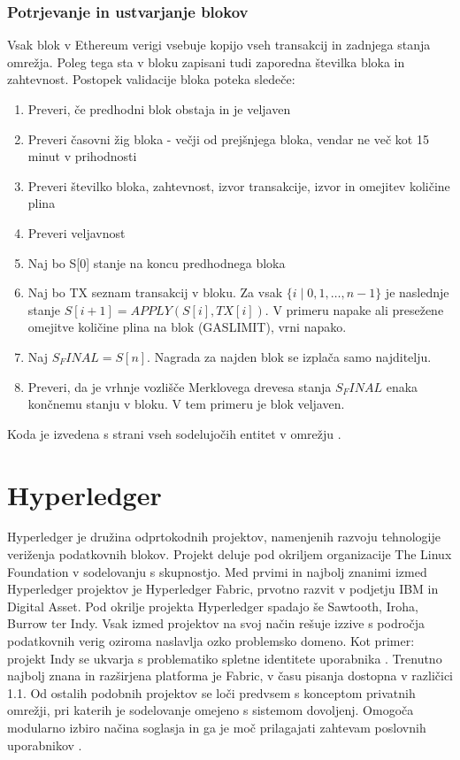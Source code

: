 \documentclass[a4paper, 12pt]{book}
\begin{document}
\subsubsection{Potrjevanje in ustvarjanje blokov}
Vsak blok v Ethereum verigi vsebuje kopijo vseh transakcij in zadnjega stanja omrežja.
Poleg tega sta v bloku zapisani tudi zaporedna številka bloka in zahtevnost.
Postopek validacije bloka poteka sledeče:
\begin{enumerate}
\item Preveri, če predhodni blok obstaja in je veljaven
\item Preveri časovni žig bloka - večji od prejšnjega bloka, vendar ne več kot 15 minut v prihodnosti
\item Preveri številko bloka, zahtevnost, izvor transakcije, izvor  in omejitev količine plina
\item Preveri veljavnost 
\item Naj bo S[0] stanje na koncu predhodnega bloka
\item Naj bo TX seznam transakcij v bloku. Za vsak 
$\{i \mid 0,1,\dots, n-1\}$
je naslednje stanje
 $S[i+1] = APPLY(S[i], TX[i])$.
V primeru napake ali presežene omejitve količine plina na blok (GASLIMIT), vrni napako.
\item Naj $S_FINAL = S[n]$. Nagrada za najden blok se izplača samo najditelju.
\item Preveri, da je vrhnje vozlišče Merklovega drevesa stanja $S_FINAL$ enaka končnemu stanju v bloku. V tem primeru je blok veljaven.
\end{enumerate}

Koda je izvedena s strani vseh sodelujočih entitet v omrežju \cite{ethereumWhitepaper}.

\section{Hyperledger}
Hyperledger je družina odprtokodnih projektov, namenjenih razvoju tehnologije veriženja podatkovnih blokov.
Projekt deluje pod okriljem organizacije The Linux Foundation v sodelovanju s skupnostjo.
Med prvimi in najbolj znanimi izmed Hyperledger projektov je Hyperledger Fabric, prvotno razvit v podjetju IBM in Digital Asset.
Pod okrilje projekta Hyperledger spadajo še Sawtooth, Iroha, Burrow ter Indy.
Vsak izmed projektov na svoj način rešuje izzive s področja podatkovnih verig oziroma naslavlja ozko problemsko domeno. Kot primer: projekt Indy se ukvarja s problematiko spletne identitete uporabnika \cite{hyperledgerWeb}.
Trenutno najbolj znana in razširjena platforma je Fabric, v času pisanja dostopna v različici 1.1.
Od ostalih podobnih projektov se loči predvsem s konceptom privatnih omrežji, pri katerih je sodelovanje omejeno s sistemom dovoljenj.
Omogoča modularno izbiro načina soglasja in ga je moč prilagajati zahtevam poslovnih uporabnikov \cite{hyperledgerIbm}.
\end{document}
